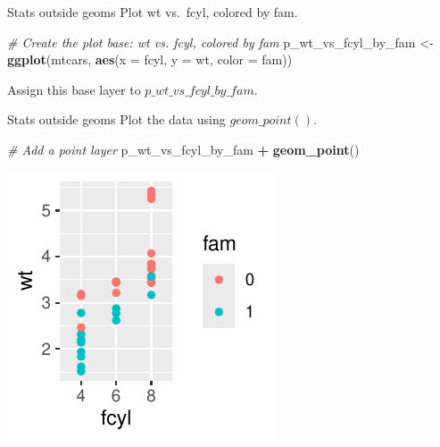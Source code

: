 \documentclass[
  ignorenonframetext,
]{beamer}
\newenvironment{Shaded}{\begin{snugshade}}{\end{snugshade}}
\newcommand{\AttributeTok}[1]{\textcolor[rgb]{0.13,0.29,0.53}{#1}}
\newcommand{\CommentTok}[1]{\textcolor[rgb]{0.56,0.35,0.01}{\textit{#1}}}
\newcommand{\FunctionTok}[1]{\textcolor[rgb]{0.13,0.29,0.53}{\textbf{#1}}}
\newcommand{\NormalTok}[1]{#1}
\newcommand{\OtherTok}[1]{\textcolor[rgb]{0.56,0.35,0.01}{#1}}
\newcommand{\SpecialCharTok}[1]{\textcolor[rgb]{0.81,0.36,0.00}{\textbf{#1}}}
\begin{document}
\begin{frame}[fragile]{Stats outside geoms}
\label{stats-outside-geoms-6}
Plot wt vs.~fcyl, colored by fam.


\begin{Shaded}
\begin{Highlighting}[]
\CommentTok{\# Create the plot base: wt vs. fcyl, colored by fam}
\NormalTok{p\_wt\_vs\_fcyl\_by\_fam }\OtherTok{\textless{}{-}} \FunctionTok{ggplot}\NormalTok{(mtcars, }\FunctionTok{aes}\NormalTok{(}\AttributeTok{x =}\NormalTok{ fcyl, }\AttributeTok{y =}\NormalTok{ wt, }\AttributeTok{color =}\NormalTok{ fam))}
\end{Highlighting}
\end{Shaded}

Assign this base layer to \(p\_wt\_vs\_fcyl\_by\_fam\).
\end{frame}

\begin{frame}[fragile]{Stats outside geoms}
\label{stats-outside-geoms-7}
Plot the data using \(geom\_point()\).


\begin{Shaded}
\begin{Highlighting}[]
\CommentTok{\# Add a point layer}
\NormalTok{p\_wt\_vs\_fcyl\_by\_fam }\SpecialCharTok{+} \FunctionTok{geom\_point}\NormalTok{()}
\end{Highlighting}
\end{Shaded}

\begin{center}\includegraphics[width=0.5\linewidth]{Figs/unnamed-chunk-29-1} \end{center}
\end{frame}
\end{document}
